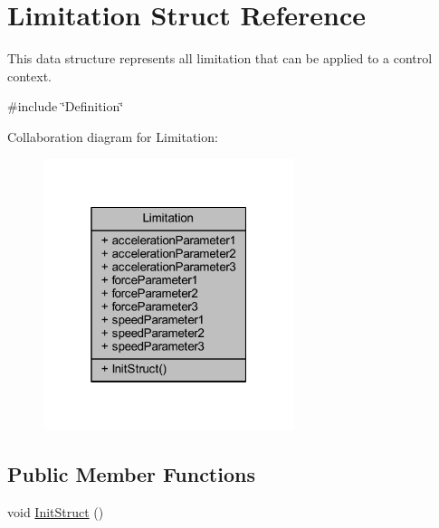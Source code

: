 \hypertarget{structLimitation}{}\section{Limitation Struct Reference}
\label{structLimitation}


This data structure represents all limitation that can be applied to a control context.  




{\ttfamily \#include \char`\"{}Definition\char`\"{}}



Collaboration diagram for Limitation\+:
\nopagebreak
\begin{figure}[H]
\begin{center}
\leavevmode
\includegraphics[width=208pt]{db/d9f/structLimitation__coll__graph}
\end{center}
\end{figure}
\subsection*{Public Member Functions}
\begin{DoxyCompactItemize}
\item 
void \hyperlink{structLimitation_a098f4ee5d0eb6baf844ff3164f1a20f6}{Init\+Struct} ()
\end{DoxyCompactItemize}
